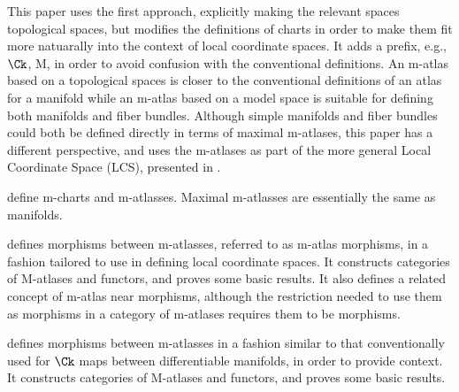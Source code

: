 \documentclass{article}
\begin{document}
This paper uses the first approach, explicitly making the relevant
spaces topological spaces, but modifies the definitions of charts in
order to make them fit more natuarally into the context of local
coordinate spaces. It adds a prefix, e.g., $\Ck$, M, in order to avoid
confusion with the conventional definitions. An m-atlas based on a
topological spaces is closer to the conventional definitions of an atlas
for a manifold while an m-atlas based on a model space is suitable for
defining both manifolds and fiber bundles. Although simple manifolds and
fiber bundles could both be defined directly in terms of maximal
m-atlases, this paper has a different perspective, and uses the
m-atlases as part of the more general Local Coordinate Space (LCS),
presented in \cite{LCS}.

 define m-charts and m-atlasses.
Maximal m-atlasses are essentially the same as manifolds.

 defines morphisms between m-atlasses, referred to
as m-atlas morphisms, in a fashion tailored to use in defining local
coordinate spaces. It constructs categories of M-atlases and functors,
and proves some basic results.  It also defines a related concept of
m-atlas near morphisms, although the restriction needed to use them as
morphisms in a category of m-atlases requires them to be morphisms.

 defines morphisms between m-atlasses in a
fashion similar to that conventionally used for $\Ck$ maps between
differentiable manifolds, in order to provide context. It constructs
categories of M-atlases and functors, and proves some basic results.
\end{document}
